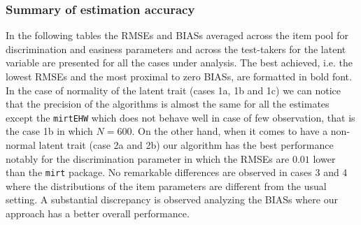 \subsubsection{Summary of estimation accuracy}
In the following tables the RMSEs and BIASs averaged across the item pool for discrimination and easiness parameters and across the test-takers for the latent variable are presented for all the cases under analysis. The best achieved, i.e. the lowest RMSEs and the most proximal to zero BIASs, are formatted in bold font. 
In the case of normality of the latent trait (cases 1a, 1b and 1c) we can notice that the precision of the algorithms is almost the same for all the estimates except the \texttt{mirt\tiny{EHW}} which does not behave well in case of few observation, that is the case 1b in which $N=600$.
On the other hand, when it comes to have a non-normal latent trait (case 2a and 2b) our algorithm has the best performance notably for the discrimination parameter in which the RMSEs are $0.01$ lower than the \texttt{mirt} package. No remarkable differences are observed in cases 3 and 4 where the distributions of the item parameters are different from the usual setting. 
A substantial discrepancy is observed analyzing the BIASs where our approach has a better overall performance.

